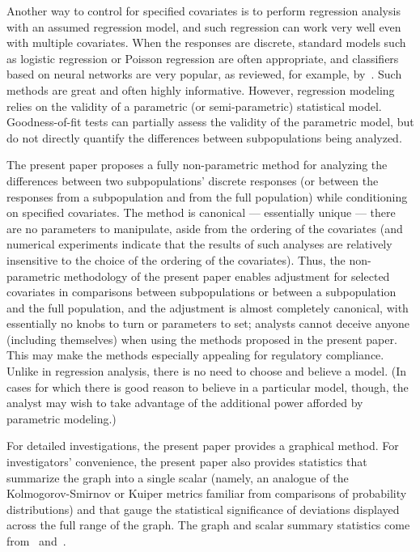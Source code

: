 \documentclass{article}
\begin{document}
Another way to control for specified covariates
is to perform regression analysis with an assumed regression model,
and such regression can work very well even with multiple covariates.
When the responses are discrete,
standard models such as logistic regression or Poisson regression
are often appropriate, and classifiers based on neural networks
are very popular, as reviewed, for example,
by~\cite{hastie-tibshirani-friedman}.
Such methods are great and often highly informative.
However, regression modeling relies on the validity
of a parametric (or semi-parametric) statistical model.
Goodness-of-fit tests can partially assess
the validity of the parametric model, but do not directly quantify
the differences between subpopulations being analyzed.

The present paper proposes a fully non-parametric method
for analyzing the differences between two subpopulations' discrete responses
(or between the responses from a subpopulation and from the full population)
while conditioning on specified covariates.
The method is canonical --- essentially unique --- there are no parameters
to manipulate, aside from the ordering of the covariates
(and numerical experiments indicate that the results of such analyses
are relatively insensitive to the choice of the ordering of the covariates).
Thus, the non-parametric methodology of the present paper
enables adjustment for selected covariates in comparisons
between subpopulations or between a subpopulation and the full population,
and the adjustment is almost completely canonical,
with essentially no knobs to turn or parameters to set;
analysts cannot deceive anyone (including themselves)
when using the methods proposed in the present paper.
This may make the methods especially appealing for regulatory compliance.
Unlike in regression analysis, there is no need to choose and believe a model.
(In cases for which there is good reason to believe in a particular model,
though, the analyst may wish to take advantage of the additional power afforded
by parametric modeling.)

For detailed investigations, the present paper provides a graphical method.
For investigators' convenience, the present paper also provides
statistics that summarize the graph into a single scalar (namely, an analogue
of the Kolmogorov-Smirnov or Kuiper metrics familiar from comparisons
of probability distributions) and that gauge the statistical significance
of deviations displayed across the full range of the graph.
The graph and scalar summary statistics
come from~\cite{tygert_full} and~\cite{tygert_two}.
\end{document}
